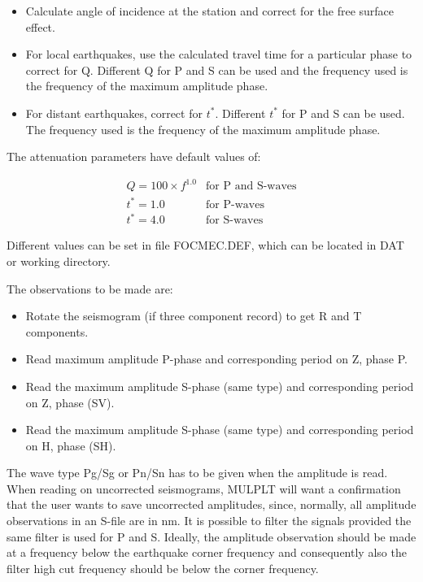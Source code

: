 \begin{itemize}
\item
Calculate angle of incidence at the station and correct for the free surface effect.
\item
For local earthquakes, use the calculated travel time for a particular phase to correct for Q. Different Q for P and S can be used and the frequency used is the frequency of the maximum amplitude phase.
\item
For distant earthquakes, correct for $t^{*}$. Different $t^{*}$ for P and S can be used.  The frequency used is the frequency of the maximum amplitude phase.
\end{itemize}

The attenuation parameters have default values of:

\begin{displaymath}
\begin{array}{ll}
Q = 100 \times f^{1.0} & \textrm{for P and S-waves}\\
t^{*} = 1.0 & \textrm{for P-waves}\\
t^{*} = 4.0 & \textrm{for S-waves}
\end{array}
\end{displaymath}

Different values can be set in file FOCMEC.DEF, which can be located in DAT or working directory.

The observations to be made are:

\begin{itemize}
\item
Rotate the seismogram (if three component record) to get R and T components.
\item
Read maximum amplitude P-phase and corresponding period on Z, phase P.
\item
Read the  maximum amplitude S-phase (same type) and corresponding period on Z, phase (SV).
\item
Read the  maximum amplitude S-phase (same type) and corresponding period on H, phase (SH).
\end{itemize}

The wave type Pg/Sg or Pn/Sn has to be given when the amplitude is read. When reading on uncorrected seismograms, MULPLT will want a confirmation that the user wants to save uncorrected amplitudes, since, normally, all amplitude observations in an S-file are in nm. It is possible to filter the signals provided the same filter is used for P and S. Ideally, the amplitude observation should be made at a frequency below the earthquake corner frequency and consequently also the filter high cut frequency should  be below the corner frequency.


